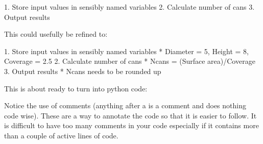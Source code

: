 \documentclass[letterpaper,10pt,english]{jupyterBook}
\begin{document}
\begin{sphinxVerbatim}[commandchars=\\\{\}]
1. Store input values in sensibly named variables
2. Calculate number of cans
3. Output results
\end{sphinxVerbatim}

\sphinxAtStartPar
This could usefully be refined to:

\begin{sphinxVerbatim}[commandchars=\\\{\}]
1. Store input values in sensibly named variables
	* Diameter = 5, Height = 8, Coverage = 2.5
2. Calculate number of cans
	* Ncans = (Surface area)/Coverage
3. Output results
	* Ncans needs to be rounded up
\end{sphinxVerbatim}

\sphinxAtStartPar
This is about ready to turn into python code:

\begin{sphinxVerbatim}[commandchars=\\\{\}]
    
  
  
  
   
    
 

\end{sphinxVerbatim}

\sphinxAtStartPar
Notice the use of comments (anything after a \sphinxcode{\sphinxupquote{\#}} is a comment and does nothing code wise). These are a way to annotate the code so that it is easier to follow. It is difficult to have too many comments in your code especially if it contains more than a couple of active lines of code.
\end{document}

